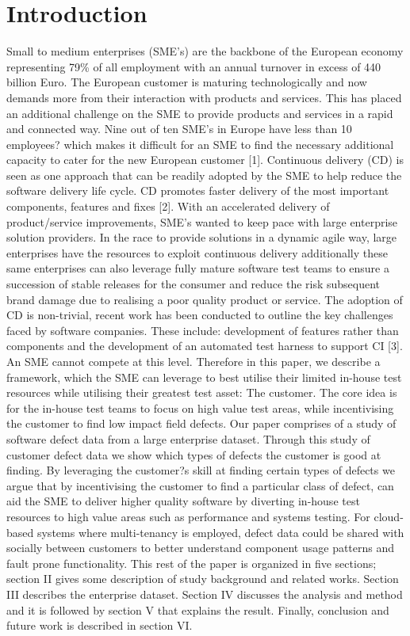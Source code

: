 \documentclass[conference]{IEEEtran}
\begin{document}
\section{Introduction}
Small to medium enterprises (SME's) are the backbone of the European economy representing 79\% of all employment with an annual turnover in excess of 440 billion Euro. The European customer is maturing technologically and now demands more from their interaction with products and services. This has placed an additional challenge on the SME to provide products and services in a rapid and connected way. Nine out of ten SME's in Europe have less than 10 employees? which makes it difficult for an SME to find the necessary additional capacity to cater for the new European customer [1]. Continuous delivery (CD) is seen as one approach that can be readily adopted by the SME to help reduce the software delivery life cycle. CD promotes faster delivery of the most important components, features and fixes [2]. With an accelerated delivery of product/service improvements, SME's wanted to keep pace with large enterprise solution providers.  In the race to provide solutions in a dynamic agile way, large enterprises have the resources to exploit continuous delivery additionally these same enterprises can also leverage fully mature software test teams to ensure a succession of stable releases for the consumer and reduce the risk subsequent brand damage due to realising a poor quality product or service. The adoption of CD is non-trivial, recent work has been conducted to outline the key challenges faced by software companies. These include: development of features rather than components and the development of an automated test harness to support CI [3]. An SME cannot compete at this level. 
Therefore in this paper, we describe a framework, which the SME can leverage to best utilise their limited in-house test resources while utilising their greatest test asset: The customer. The core idea is for the in-house test teams to focus on high value test areas, while incentivising the customer to find   low impact field defects. Our paper comprises of a study of software defect data from a large enterprise dataset. Through this study of customer defect data we show which types of defects the customer is good at finding. By leveraging the customer?s skill at finding certain types of defects we argue that by incentivising the customer to find a particular class of defect, can aid the SME to deliver higher quality software by diverting in-house test resources to high value areas such as performance and systems testing.  
For cloud-based systems where multi-tenancy is employed, defect data could be shared with socially between customers to better understand component usage patterns and fault prone functionality.
This rest of the paper is organized in five sections; section II gives some description of study background and related works. Section III describes the enterprise dataset. Section IV discusses the analysis and method and it is followed by section V that explains the result. Finally, conclusion and future work is described in section VI.
\end{document}
